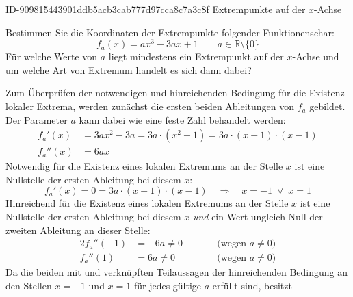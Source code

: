 \begin{exercise}
      {ID-909815443901ddb5acb3cab777d97cca8c7a3c8f}
      {Extrempunkte auf der $x$-Achse}
  \ifproblem\problem\par
    Bestimmen Sie die Koordinaten der Extrempunkte
    folgender Funktionenschar:
    \begin{equation*}
      f_a(x)=ax^3-3ax+1
      \qquad
      a\in\mathbb{R}\setminus\{0\}
    \end{equation*}
    Für welche Werte von $a$ liegt mindestens ein
    Extrempunkt auf der $x$-Achse und um welche
    Art von Extremum handelt es sich dann dabei?
  \fi
  \ifoutcome\outcome\par
    Zum Überprüfen der notwendigen und
    hinreichenden Bedingung für die
    Existenz lokaler Extrema, werden
    zunächst die ersten beiden Ableitungen
    von $f_a$ gebildet. Der Parameter $a$ kann
    dabei wie eine feste Zahl behandelt
    werden:
    \begin{equation*}
      \begin{split}
        f_{a}'(x)&=3ax^2-3a
                  =3a\cdot(x^2-1)
                  =3a\cdot(x+1)\cdot(x-1)
        \\[1ex]
        f_{a}''(x)&=6ax
      \end{split}
    \end{equation*}
    Notwendig für die Existenz eines
    lokalen Extremums an der Stelle $x$
    ist eine Nullstelle der ersten
    Ableitung bei diesem $x$:
    \begin{equation*}
      f_{a}'(x)=0=3a\cdot(x+1)\cdot(x-1)
      \quad\Rightarrow\quad
      x=-1\;\lor\;x=1
    \end{equation*}
    Hinreichend für die Existenz eines
    lokalen Extremums an der Stelle $x$
    ist eine Nullstelle der ersten
    Ableitung bei diesem $x$
    \emph{und} ein Wert ungleich Null
    der zweiten Ableitung an dieser
    Stelle:
    \begin{alignat*}{2}
      f_{a}''(-1)&=-6a\neq0
      & \qquad&\text{(wegen $a\neq0$)}
      \\[1ex]
      f_{a}''(1)&=6a\neq0
      & \qquad&\text{(wegen $a\neq0$)}
    \end{alignat*}
    Da die beiden mit \glqq und\grqq{}
    verknüpften Teilaussagen der
    hinreichenden Bedingung an den
    Stellen $x=-1$ und $x=1$ für jedes
    gültige $a$ erfüllt sind, besitzt

\end{exercise}
